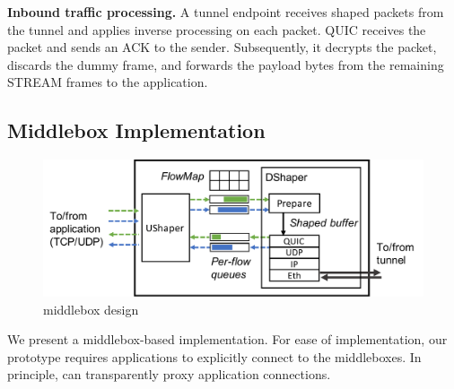 
\textbf{Inbound traffic processing.}
A tunnel endpoint receives shaped packets from the tunnel and applies inverse
processing on each packet.
QUIC receives the packet and
sends an ACK to the sender. Subsequently, it decrypts the packet, discards the
dummy frame, and forwards the payload bytes from the remaining STREAM frames to
the application.

\subsection{Middlebox Implementation}
\label{sec:implementation}

\begin{figure}[t]
    \centering
    \includegraphics[width=\columnwidth]{middlebox-arch3.pdf}
    \caption{{\sys} middlebox design}
    \vspace{-0.4cm}
    \label{fig:minesvpn-impl}
\end{figure}

We present a middlebox-based {\sys} implementation.
%
%
For ease of implementation, our prototype requires applications to explicitly
connect to the middleboxes.
In principle, {\sys} can transparently proxy application
connections.

